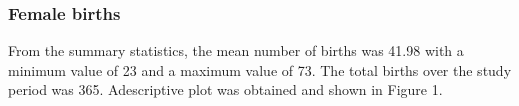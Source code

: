 \documentclass[11]{article}
\begin{document}
\subsubsection{Female births}
From the summary statistics, the mean number of births was 41.98 with a minimum value of 23 and a maximum value of 73. The total births over the study period was 365. Adescriptive plot was obtained and shown in Figure 1. 
\begin{figure}%
	    \centering
	    \qquad
	    \qquad

\end{figure}
\end{document}
